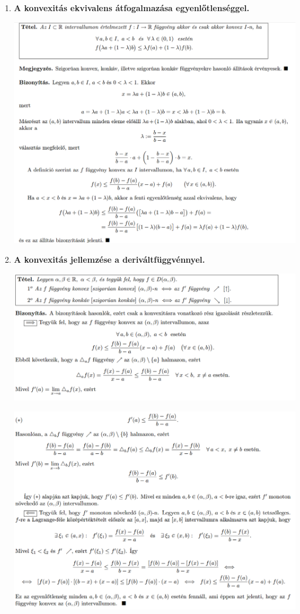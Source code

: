 \documentclass[a4paper,11.5pt]{article}
\begin{document}
	\begin{enumerate}
		\item \textbf{A konvexitás ekvivalens átfogalmazása egyenlőtlenséggel.}
		
		\includegraphics[width = \textwidth]{kepek/01.png}
		
		\item \textbf{A konvexitás jellemzése a deriváltfüggvénnyel.}
		
		\includegraphics[width = \textwidth]{kepek/02true_1.png}
		
		\includegraphics[width = \textwidth]{kepek/02true_2.png}
		

\end{enumerate}
\end{document}
